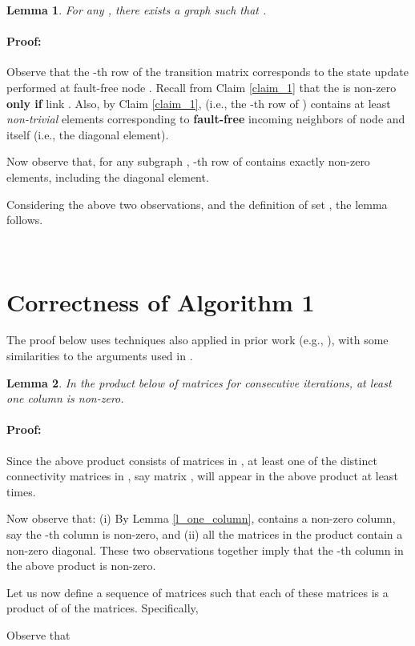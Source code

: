 \documentclass[letterpaper, 12pt]{article}
\newenvironment{proof}{\paragraph{\bf Proof:}}{\hspace*{\fill}}
\newtheorem{lemma}{Lemma}
\begin{document}
\begin{lemma}
\label{l_H}
For any , there exists a graph  such that
.
\end{lemma}
\begin{proof}
Observe that the -th row of the transition matrix  corresponds to the state update
performed at fault-free node . Recall from Claim \ref{claim_1} that
the  is non-zero {\bf only if} link .
Also, by Claim \ref{claim_1},
 (i.e., the -th row of )
contains at least 
{\em non-trivial} elements corresponding
to {\bf fault-free} incoming neighbors of node  and itself (i.e., the
diagonal element).

Now observe that, for any subgraph , -th row of 
 contains exactly  non-zero elements,
including the diagonal element.

Considering the above two observations, and the definition of set ,
the lemma follows.
\end{proof}

~

\section{Correctness of Algorithm 1}


The proof below uses techniques also applied in prior work
(e.g., \cite{jadbabaie_consensus,Benezit,vaidyaII,Zhang}),
with some similarities to the arguments used in \cite{vaidyaII,Zhang}.

\begin{lemma}
\label{l_product_H}
In the product below of  matrices for consecutive
 iterations, at least one column is non-zero. 

\end{lemma}
\begin{proof}
Since the above product consists of  matrices
in ,
at least one of the  distinct connectivity matrices
in , say matrix , will appear in the above
product at least  times.

Now observe that: (i)
By Lemma \ref{l_one_column},  contains a non-zero
column, say the -th column is non-zero,
and (ii) all the  matrices in the product contain a non-zero diagonal.
These two observations together imply that the -th column in the above product 
is non-zero.
\end{proof}


Let us now define a sequence of matrices  such that
each of these matrices is a product of  of the
 matrices. Specifically,

Observe that
\end{document}
